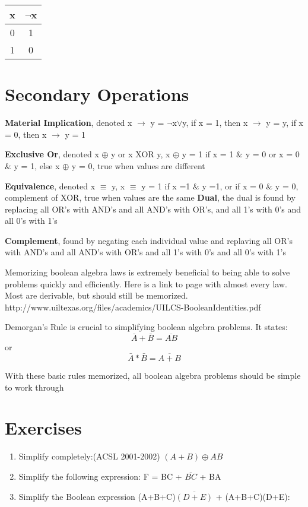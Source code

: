 \documentclass[10pt]{article}
\begin{document}
\begin{center}
\begin{tabular}{ |c|c| }
 \hline
 x & $\neg$x \\
 \hline
  0 & 1  \\
 \hline
 1 & 0 \\
 \hline
\end{tabular}
\end{center}

\section{Secondary Operations}

\textbf{Material Implication}, denoted  x $\rightarrow$ y = $\neg$x$\lor$y, if x = 1, then x $\rightarrow$ y = y, if x = 0, then x $\rightarrow$ y = 1

\noindent
\textbf{Exclusive Or}, denoted x $\oplus$ y or x XOR y, x $\oplus$ y = 1 if x = 1 $\&$ y = 0 or x = 0 $\&$ y = 1, else x $\oplus$ y = 0, true when values are different

\noindent
\textbf{Equivalence}, denoted x $\equiv$ y, x $\equiv$ y = 1 if x =1 $\&$ y =1, or if x = 0 $\&$ y = 0, complement of XOR, true when values are the same
\noindent
\textbf{Dual}, the dual is found by replacing all OR's with AND's and all AND's with OR's, and all 1's with 0's and all 0's with 1's

\noindent
\textbf{Complement}, found by negating each individual value and replaving all OR's with AND's and all AND's with OR's and all 1's with 0's and all 0's with 1's
\bigskip

\noindent
Memorizing boolean algebra laws is extremely beneficial to being able to solve problems quickly and efficiently. Here is a link to page with almost every law. Most are derivable, but should still be memorized.  http://www.uiltexas.org/files/academics/UILCS-BooleanIdentities.pdf

Demorgan's Rule is crucial to simplifying boolean algebra problems. It states: $$ \bar{A} + \bar{B} = \overline{AB}$$ or $$ \bar{A} * \bar{B} = \overline{A+B}$$

\bigskip

\noindent
With these basic rules memorized, all boolean algebra problems should be simple to work through

\section{Exercises}
\begin{enumerate}
\item Simplify completely:(ACSL 2001-2002)
$( A + B )\oplus A B$

\item Simplify the following expression: F = BC + $\overline{BC}$ + BA

\item Simplify the Boolean expression (A+B+C)$\overline{(D+E)}$ + (A+B+C)(D+E):
\end{enumerate}

\end{document}
